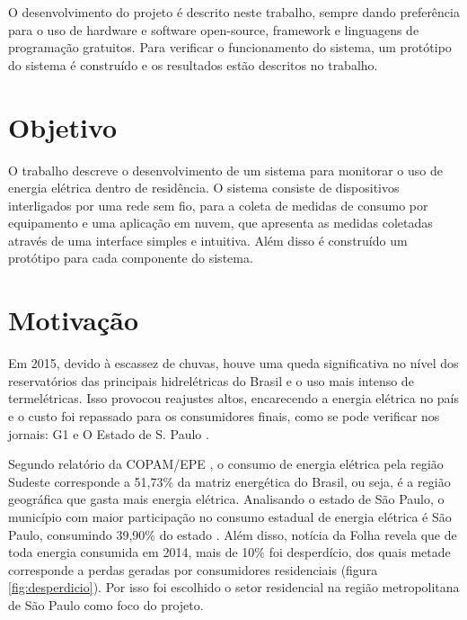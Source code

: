 O desenvolvimento do projeto é descrito neste trabalho, sempre dando preferência para o uso de hardware e software open-source, framework e linguagens de programação gratuitos. Para verificar o funcionamento do sistema, um protótipo do sistema é construído e os resultados estão descritos no trabalho.

\section{Objetivo}
\label{Sec:objetivo}

O trabalho descreve o desenvolvimento de um sistema para monitorar o uso de energia elétrica dentro de residência. O sistema consiste de dispositivos interligados por uma rede sem fio, para a coleta de medidas de consumo por equipamento e uma aplicação em nuvem, que apresenta as medidas coletadas através de uma interface simples e intuitiva. Além disso é construído um protótipo para cada componente do sistema.

\section{Motivação}
\label{Sec:motivacao}

Em 2015, devido à escassez de chuvas, houve uma queda significativa no nível dos reservatórios das principais hidrelétricas do Brasil e o uso mais intenso de termelétricas. Isso provocou reajustes altos, encarecendo a energia elétrica no país e o custo foi repassado para os consumidores finais, como se pode verificar nos jornais: G1 \cite{news_g1} e O Estado de S. Paulo \cite{news_secretaria_de_energia}.

Segundo relatório da COPAM/EPE \cite{copam_epe}, o consumo de energia elétrica pela região Sudeste corresponde a 51,73\% da matriz energética do Brasil, ou seja, é a região geográfica que gasta mais energia elétrica. Analisando o estado de São Paulo, o município com maior participação no consumo estadual de energia elétrica é São Paulo, consumindo 39,90\% do estado \cite{itu}. Além disso, notícia da Folha \cite{folha} revela que de toda energia consumida em 2014, mais de 10\% foi desperdício, dos quais metade corresponde a perdas geradas por consumidores residenciais (figura \ref{fig:desperdicio}). Por isso foi escolhido o setor residencial na região metropolitana de São Paulo como foco do projeto.


